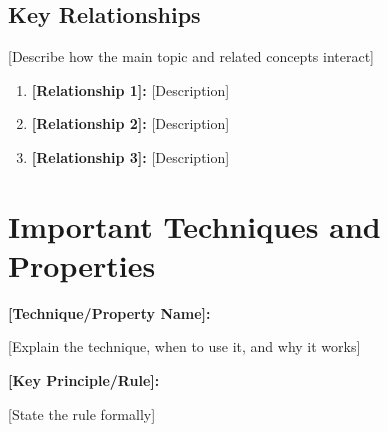 \documentclass[12pt,letterpaper]{article}
\begin{document}
\subsection{Key Relationships}

[Describe how the main topic and related concepts interact]

\begin{enumerate}
  \item \textbf{[Relationship 1]:} [Description]
  \item \textbf{[Relationship 2]:} [Description]
  \item \textbf{[Relationship 3]:} [Description]
\end{enumerate}


\section{Important Techniques and Properties}

\begin{skillbox}
\textbf{[Technique/Property Name]:}

[Explain the technique, when to use it, and why it works]
\end{skillbox}

\begin{theorem}
\textbf{[Key Principle/Rule]:}

[State the rule formally]
\end{theorem}

\begin{analogy}
\end{analogy}
\end{document}
